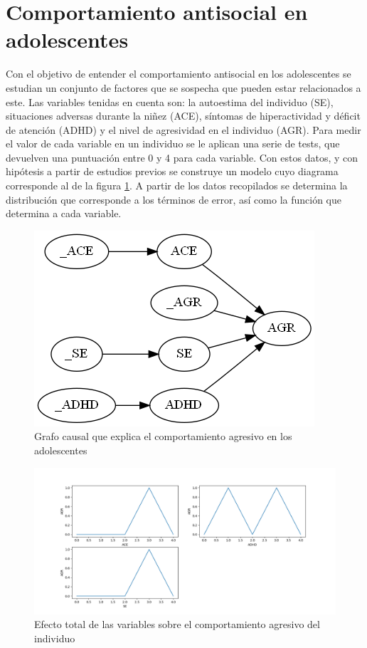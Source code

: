 \vspace{100px}
\section{Comportamiento antisocial en adolescentes}
Con el objetivo de entender el comportamiento antisocial en los adolescentes se estudian un conjunto de factores que se sospecha que pueden estar relacionados a este. Las variables tenidas en cuenta son: la autoestima del individuo (SE), situaciones adversas durante la niñez (ACE), síntomas de hiperactividad y déficit de atención (ADHD) y el nivel de agresividad en el individuo (AGR). Para medir el valor de cada variable en un individuo se le aplican una serie de tests, que devuelven una puntuación entre 0 y 4 para cada variable. Con estos datos, y con hipótesis a partir de estudios previos se construye un modelo cuyo diagrama corresponde al de la figura \ref{fig:agression}. A partir de los datos recopilados se determina la distribución que corresponde a los términos de error, así como la función que determina a cada variable.

\begin{figure}[h!]
	\centering
	\includegraphics[width=.7\linewidth]{./images/Chapter-4/agression.png}
	\caption{Grafo causal que explica el comportamiento agresivo en los adolescentes}
	\label{fig:agression}
\end{figure}

\begin{figure}[h!]
	\includegraphics[width=\linewidth]{./images/Chapter-4/agression-charts.png}
	\caption{Efecto total de las variables sobre el comportamiento agresivo del individuo}
	\label{fig:agression-charts}
\end{figure}

